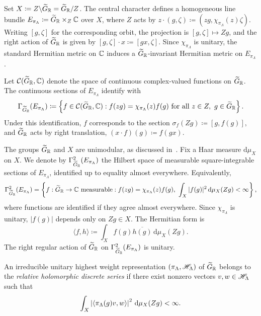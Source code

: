 Set $X\coloneqq Z\backslash\widetilde{G}_{{\mathbb R}}=\widetilde{G}_{{\mathbb R}}/Z$. The central character defines a homogeneous line bundle
$
E_{\pi_{\Lambda}}\coloneqq\widetilde{G}_{{\mathbb R}}\times_Z{\mathbb C}
$
over $X$, where $Z$ acts by
$
z\cdot(g,\zeta)\coloneqq(zg,\chi_{\pi_{\Lambda}}(z)\zeta).
$
Writing $[g,\zeta]$ for the corresponding orbit, the projection is $[g,\zeta]\mapsto Zg$, and the right action of $\widetilde{G}_{{\mathbb R}}$ is given by
$
[g,\zeta]\cdot x\coloneqq[gx,\zeta].
$
Since $\chi_{\pi_{\Lambda}}$ is unitary, the standard Hermitian metric on ${\mathbb C}$ induces a $\widetilde{G}_{{\mathbb R}}$-invariant Hermitian metric on $E_{\pi_{\Lambda}}$.

Let ${\mathcal C}(\widetilde{G}_{{\mathbb R}},{\mathbb C})$ denote the space of continuous complex-valued functions on $\widetilde{G}_{{\mathbb R}}$. The continuous sections of $E_{\pi_{\Lambda}}$ identify with
\begin{equation}
\Gamma_{\widetilde{G}_{{\mathbb R}}}(E_{\pi_{\Lambda}})
\coloneqq
\left\{
f\in{\mathcal C}(\widetilde{G}_{{\mathbb R}},{\mathbb C}):
f(zg)=\chi_{\pi_{\Lambda}}(z)f(g)
\text{ for all }z\in Z,\ g\in\widetilde{G}_{{\mathbb R}}
\right\}.
\end{equation}
Under this identification, $f$ corresponds to the section
$
\sigma_f(Zg)\coloneqq[g,f(g)],
$
and $\widetilde{G}_{{\mathbb R}}$ acts by right translation,
$
(x\cdot f)(g)\coloneqq f(gx).
$

The groups $\widetilde{G}_{{\mathbb R}}$ and $X$ are unimodular, as discussed in~\cite[Remark~3.5 and proof of Proposition~2.2]{NeebSquareIntegrable}. Fix a Haar measure $\mathrm d\mu_X$ on $X$. We denote by $\Gamma_{\widetilde{G}_{{\mathbb R}}}^{2}(E_{\pi_{\Lambda}})$ the Hilbert space of measurable square-integrable sections of $E_{\pi_{\Lambda}}$, identified up to equality almost everywhere. Equivalently,
\begin{equation}
\Gamma_{\widetilde{G}_{{\mathbb R}}}^{2}(E_{\pi_{\Lambda}})
=
\left\{
f:\widetilde{G}_{{\mathbb R}}\to{\mathbb C}\text{ measurable}:
f(zg)=\chi_{\pi_{\Lambda}}(z)f(g),\
\int_X |f(g)|^2\,\mathrm d\mu_X(Zg)<\infty
\right\},
\end{equation}
where functions are identified if they agree almost everywhere. Since $\chi_{\pi_{\Lambda}}$ is unitary, $|f(g)|$ depends only on $Zg\in X$. The Hermitian form is
\begin{equation}
\langle f,h\rangle
\coloneqq
\int_X f(g)\overline{h(g)}\,\mathrm d\mu_X(Zg).
\end{equation}
The right regular action of $\widetilde{G}_{{\mathbb R}}$ on $\Gamma_{\widetilde{G}_{{\mathbb R}}}^{2}(E_{\pi_{\Lambda}})$ is unitary.

\begin{definition}[{\cite[Definition~2.1]{NeebSquareIntegrable}}]
An irreducible unitary highest weight representation $(\pi_{\Lambda},{\mathscr{H}}_{\Lambda})$ of $\widetilde{G}_{{\mathbb R}}$ belongs to the \emph{relative holomorphic discrete series} if there exist nonzero vectors $v,w\in{\mathscr{H}}_{\Lambda}$ such that
\begin{equation}
\int_X
\left|{\langle\pi_{\Lambda}(g)v,w\rangle}\right|^{2}
\,\mathrm d\mu_X(Zg)
<\infty.
\end{equation}
\end{definition}

